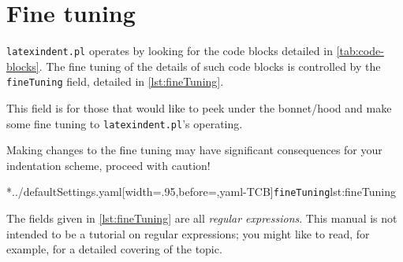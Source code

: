 \section{Fine tuning}\label{sec:finetuning}
 \texttt{latexindent.pl} operates by looking for the code blocks detailed in
 \vref{tab:code-blocks}.
  The fine tuning of the details of such code blocks
 is controlled by the \texttt{fineTuning} field, detailed in \cref{lst:fineTuning}.

 This field is for those that would like to peek under the bonnet/hood and make some fine
 tuning to \texttt{latexindent.pl}'s operating.

 \begin{warning}
	 Making changes to the fine tuning may have significant consequences for your indentation scheme,
	 proceed with caution!
 \end{warning}

 \begin{widepage}
	 \cmhlistingsfromfile*[style=fineTuning]*{../defaultSettings.yaml}[width=.95\linewidth,before=\centering,yaml-TCB]{\texttt{fineTuning}}{lst:fineTuning}
 \end{widepage}

 The fields given in \cref{lst:fineTuning} are all \emph{regular expressions}. This manual
 is not intended to be a tutorial on regular expressions; you might like to read, for
 example, \cite{masteringregexp} for a detailed covering of the topic.

